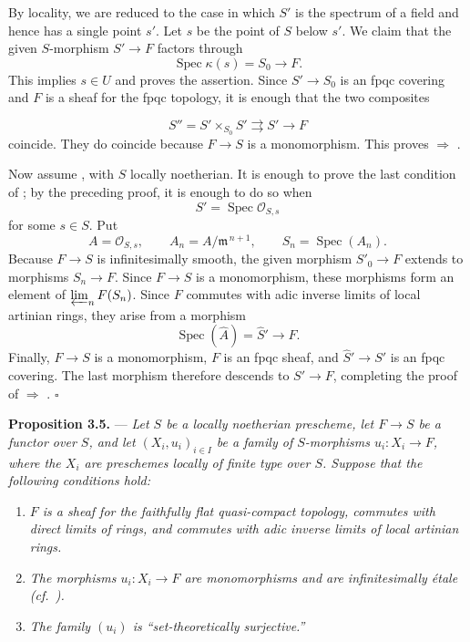 By locality, we are reduced to the case in which \(S'\) is the
spectrum of a field and hence has a single point \(s'\).  Let \(s\)
be the point of \(S\) below \(s'\).  We claim that the given
\(S\)-morphism \(S'\to F\) factors through
\[
  \operatorname{Spec}\kappa(s)=S_0\longrightarrow F.
\]
This implies \(s\in U\) and proves the assertion.  Since
\(S'\to S_0\) is an fpqc covering and \(F\) is a sheaf for the fpqc
topology, it is enough that the two composites

\[
  S''=S'\times_{S_0}S'
  \rightrightarrows S'\longrightarrow F
\]
coincide.  They do coincide because \(F\to S\) is a monomorphism.
This proves  \(\Rightarrow\) .

Now assume , with \(S\) locally noetherian.  It is enough to
prove the last condition of ; by the preceding proof, it is
enough to do so when
\[
  S'=\operatorname{Spec}\mathscr O_{S,s}
\]
for some \(s\in S\).  Put
\[
  A=\mathscr O_{S,s},
  \qquad
  A_n=A/\mathfrak m^{\,n+1},
  \qquad
  S_n=\operatorname{Spec}(A_n).
\]
Because \(F\to S\) is infinitesimally smooth, the given morphism
\(S'_0\to F\) extends to morphisms \(S_n\to F\).  Since \(F\to S\)
is a monomorphism, these morphisms form an element of
\(\varprojlim_n F(S_n)\).  Since \(F\) commutes with adic inverse
limits of local artinian rings, they arise from a morphism
\[
  \operatorname{Spec}(\widehat A)=\widehat S'\longrightarrow F.
\]
Finally, \(F\to S\) is a monomorphism, \(F\) is an fpqc sheaf, and
\(\widehat S'\to S'\) is an fpqc covering.  The last morphism
therefore descends to \(S'\to F\), completing the proof of
 \(\Rightarrow\) . \hfill\(\square\)

\medskip
\noindent{}\textbf{Proposition 3.5.} ---
\textit{Let \(S\) be a locally noetherian prescheme, let \(F\to S\)
be a functor over \(S\), and let
\((X_i,u_i)_{i\in I}\) be a family of \(S\)-morphisms
\(u_i:X_i\to F\), where the \(X_i\) are preschemes locally of finite
type over \(S\).  Suppose that the following conditions hold:}

\begin{enumerate}
\item[(a)] 
\textit{\(F\) is a sheaf for the faithfully flat quasi-compact
topology, commutes with direct limits of rings, and commutes with adic
inverse limits of local artinian rings.}

\item[(b)] 
\textit{The morphisms \(u_i:X_i\to F\) are monomorphisms and are
infinitesimally étale
(cf.\ ).}

\item[(c)] 
\textit{The family \((u_i)\) is ``set-theoretically surjective.''}
\end{enumerate}

